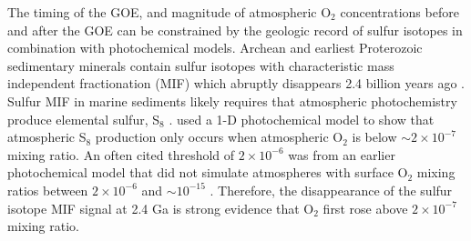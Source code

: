 The timing of the GOE, and magnitude of atmospheric O$_2$ concentrations before and after the GOE can be constrained by the geologic record of sulfur isotopes in combination with photochemical models. Archean and earliest Proterozoic sedimentary minerals contain sulfur isotopes with characteristic mass independent fractionation (MIF) which abruptly disappears 2.4 billion years ago \citep{Warke_2020}. Sulfur MIF in marine sediments likely requires that atmospheric photochemistry produce elemental sulfur, S$_8$ \citep[for explanation, see the introduction in][]{Zahnle_2006} \citep{Pavlov_2002,Farquhar_2000}. \citet{Zahnle_2006} used a 1-D photochemical model to show that atmospheric S$_8$ production only occurs when atmospheric O$_2$ is below $\sim 2 \times 10^{-7}$ mixing ratio. An often cited threshold of $2 \times 10^{-6}$ was from an earlier photochemical model that did not simulate atmospheres with surface O$_2$ mixing ratios between $2 \times 10^{-6}$ and $\sim 10^{-15}$ \citep{Pavlov_2002}. Therefore, the disappearance of the sulfur isotope MIF signal at 2.4 Ga is strong evidence that O$_2$ first rose above $2 \times 10^{-7}$ mixing ratio.